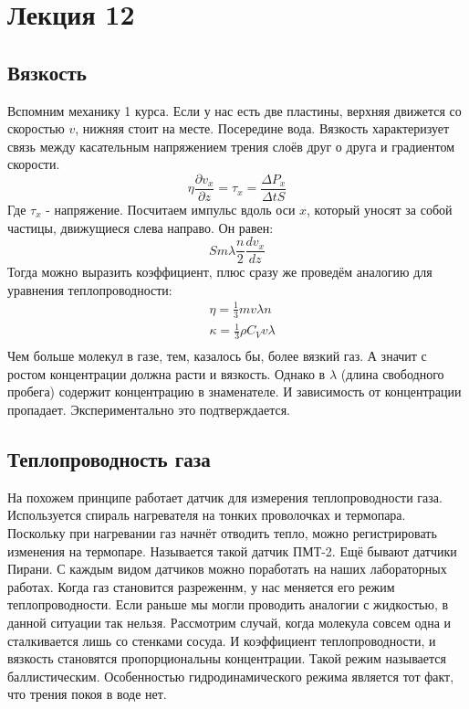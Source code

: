 \documentclass[a4paper, 12pt]{article}
\begin{document}
	\section{Лекция 12}
	\subsection{Вязкость}
	Вспомним механику 1 курса. Если у нас есть две пластины, верхняя движется со скоростью $v$, нижняя стоит на месте. Посередине вода. Вязкость характеризует связь между касательным напряжением трения слоёв друг о друга и градиентом скорости.
	\begin{equation*}
		\eta \frac{\partial v_{x}}{\partial z} = \tau_{x} = \frac{\Delta P_{x}}{\Delta t S}
	\end{equation*}
	Где $\tau_{x}$ - напряжение. Посчитаем импульс вдоль оси $x$, который уносят за собой частицы, движущиеся слева направо. Он равен:
	\begin{equation*}
		Sm\lambda \frac{n}{2} \frac{dv_{x}}{dz} 
	\end{equation*}
	Тогда можно выразить коэффициент, плюс сразу же проведём аналогию для уравнения теплопроводности:
	\begin{equation*}
		\begin{aligned}
			& \eta = \frac{1}{3} m v \lambda n         \\
			& \kappa =\frac{1}{3} \rho C_{V} v \lambda \\
		\end{aligned}
	\end{equation*}
	Чем больше молекул в газе, тем, казалось бы, более вязкий газ. А значит с ростом концентрации должна расти и вязкость. Однако в $\lambda$ (длина свободного пробега) содержит концентрацию в знаменателе. И зависимость от концентрации пропадает. Экспериментально это подтверждается. 
	
	\subsection{Теплопроводность газа}
	На похожем принципе работает датчик для измерения теплопроводности газа. Используется спираль нагревателя на тонких проволочках и термопара. Поскольку при нагревании газ начнёт отводить тепло, можно регистрировать изменения на термопаре. Называется такой датчик ПМТ-2. Ещё бывают датчики Пирани. С каждым видом датчиков можно поработать на наших лабораторных работах. Когда газ становится разреженнм, у нас меняется его режим теплопроводности. Если раньше мы могли проводить аналогии с жидкостью, в данной ситуации так нельзя. Рассмотрим случай, когда молекула совсем одна и сталкивается лишь со стенками сосуда. И коэффициент теплопроводности, и вязкость становятся пропорциональны концентрации. Такой режим называется баллистическим. Особенностью гидродинамического режима является тот факт, что трения покоя в воде нет.
	
\end{document}
